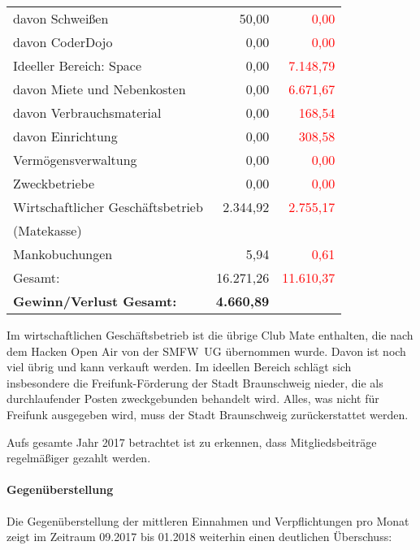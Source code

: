 \documentclass{s0minutes}
\begin{document}
\begin{longtable}{lr>{\textcolor{red}\bgroup}r<{\egroup}}
  \quad davon Schweißen             &       50{,}00 &         0{,}00 \\
  \quad davon CoderDojo             &        0{,}00 &         0{,}00 \\
  \midrule
  Ideeller Bereich: Space           &        0{,}00 &   7{.}148{,}79 \\
  \quad davon Miete und Nebenkosten &        0{,}00 &   6{.}671{,}67 \\
  \quad davon Verbrauchsmaterial    &        0{,}00 &       168{,}54 \\
  \quad davon Einrichtung           &        0{,}00 &       308{,}58 \\
  \midrule
  Vermögensverwaltung               &        0{,}00 &         0{,}00 \\
  \midrule
  Zweckbetriebe                     &        0{,}00 &         0{,}00 \\
  \midrule
  Wirtschaftlicher Geschäftsbetrieb &  2{.}344{,}92 &   2{.}755{,}17 \\
  \quad (Matekasse) && \\
  \midrule
  Mankobuchungen                    &        5{,}94 &         0{,}61 \\
  \midrule\midrule
  Gesamt:                           & 16{.}271{,}26 &  11{.}610{,}37 \\

  \textbf{Gewinn/Verlust Gesamt:} & \textbf{4{.}660{,}89} &          \\
\end{longtable}

Im wirtschaftlichen Geschäftsbetrieb ist die übrige Club Mate enthalten, die
nach dem Hacken Open Air von der SMFW~UG übernommen wurde. Davon ist noch viel
übrig und kann verkauft werden. Im ideellen Bereich schlägt sich insbesondere
die Freifunk-Förderung der Stadt Braunschweig nieder, die als durchlaufender
Posten zweckgebunden behandelt wird. Alles, was nicht für Freifunk ausgegeben
wird, muss der Stadt Braunschweig zurückerstattet werden.

Aufs gesamte Jahr 2017 betrachtet ist zu erkennen, dass Mitgliedsbeiträge
regelmäßiger gezahlt werden.

\paragraph{Gegenüberstellung}
Die Gegenüberstellung der mittleren Einnahmen und Verpflichtungen pro
Monat zeigt im Zeitraum 09.2017 bis 01.2018 weiterhin einen
deutlichen Überschuss:
\end{document}
